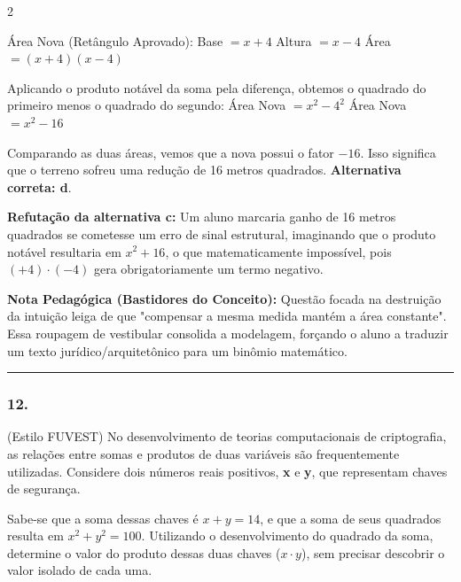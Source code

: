 \begin{multicols*}{2}
\begin{tcolorbox}[colback=CorTitUm!5, colframe=CorTitUm, boxrule=1pt, arc=4pt, left=6pt, right=6pt, top=6pt, bottom=6pt]
    Área Nova (Retângulo Aprovado):
    Base $ = x + 4 $
    Altura $ = x - 4 $
    Área $ = (x + 4)(x - 4) $
    
    Aplicando o produto notável da soma pela diferença, obtemos o quadrado do primeiro menos o quadrado do segundo:
    Área Nova $ = x^2 - 4^2 $
    Área Nova $ = x^2 - 16 $
    
    Comparando as duas áreas, vemos que a nova possui o fator $ -16 $. Isso significa que o terreno sofreu uma redução de 16 metros quadrados.
    \textbf{Alternativa correta: d}.
    
    \textbf{Refutação da alternativa c:} Um aluno marcaria ganho de 16 metros quadrados se cometesse um erro de sinal estrutural, imaginando que o produto notável resultaria em $ x^2 + 16 $, o que matematicamente impossível, pois $ (+4) \cdot (-4) $ gera obrigatoriamente um termo negativo.
    \end{tcolorbox}
    \vspace{0.15cm}
    
    \begin{boxexplicacao}
    \textbf{Nota Pedagógica (Bastidores do Conceito):} Questão focada na destruição da intuição leiga de que "compensar a mesma medida mantém a área constante". Essa roupagem de vestibular consolida a modelagem, forçando o aluno a traduzir um texto jurídico/arquitetônico para um binômio matemático.
    \end{boxexplicacao}
\fi

\par\vspace{\espacoQuestao}

\noindent\textcolor{CorLinha}{\rule{\linewidth}{0.5pt}} 
\par\vspace{\espacoPreQuestao}
\subsubsection*{12.} 
\begin{enunciadoLiteral}
(Estilo FUVEST) No desenvolvimento de teorias computacionais de criptografia, as relações entre somas e produtos de duas variáveis são frequentemente utilizadas. Considere dois números reais positivos, \textbf{x} e \textbf{y}, que representam chaves de segurança. 

Sabe-se que a soma dessas chaves é $ x + y = 14 $, e que a soma de seus quadrados resulta em $ x^2 + y^2 = 100 $. Utilizando o desenvolvimento do quadrado da soma, determine o valor do produto dessas duas chaves ($ x \cdot y $), sem precisar descobrir o valor isolado de cada uma.
\end{enunciadoLiteral}


\end{multicols*}
